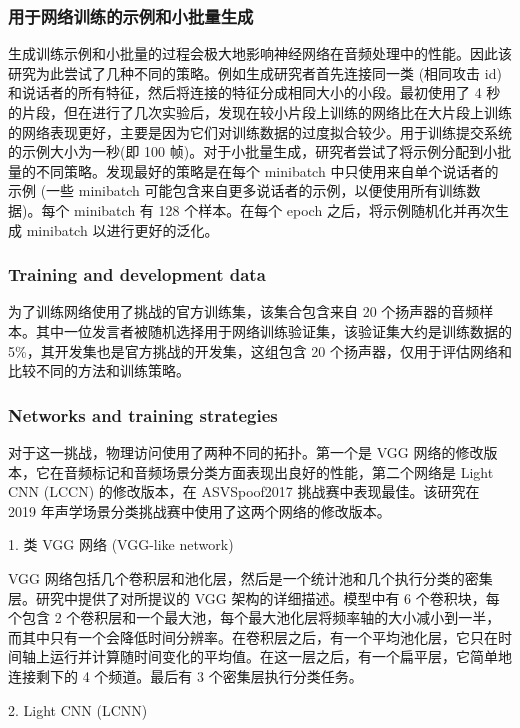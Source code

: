 \subsubsection{用于网络训练的示例和小批量生成}

生成训练示例和小批量的过程会极大地影响神经网络在音频处理中的性能。因此该研究为此尝试了几种不同的策略。例如生成研究者首先连接同一类 (相同攻击 id)和说话者的所有特征，然后将连接的特征分成相同大小的小段。最初使用了 4 秒的片段，但在进行了几次实验后，发现在较小片段上训练的网络比在大片段上训练的网络表现更好，主要是因为它们对训练数据的过度拟合较少。用于训练提交系统的示例大小为一秒(即 100 帧)。对于小批量生成，研究者尝试了将示例分配到小批量的不同策略。发现最好的策略是在每个 minibatch 中只使用来自单个说话者的示例 (一些 minibatch 可能包含来自更多说话者的示例，以便使用所有训练数据)。每个 minibatch 有 128 个样本。在每个 epoch 之后，将示例随机化并再次生成 minibatch 以进行更好的泛化。

\subsubsection{Training and development data}

为了训练网络使用了挑战的官方训练集，该集合包含来自 20 个扬声器的音频样本。其中一位发言者被随机选择用于网络训练验证集，该验证集大约是训练数据的 5\%，其开发集也是官方挑战的开发集，这组包含 20 个扬声器，仅用于评估网络和比较不同的方法和训练策略。

\subsubsection{Networks and training strategies}

对于这一挑战，物理访问使用了两种不同的拓扑。第一个是 VGG 网络的修改版本，它在音频标记和音频场景分类方面表现出良好的性能，第二个网络是 Light CNN (LCCN) 的修改版本，在 ASVSpoof2017 挑战赛中表现最佳。该研究在 2019 年声学场景分类挑战赛中使用了这两个网络的修改版本。

1. 类 VGG 网络 (VGG-like network)

VGG 网络包括几个卷积层和池化层，然后是一个统计池和几个执行分类的密集层。研究中提供了对所提议的 VGG 架构的详细描述。模型中有 6 个卷积块，每个包含 2 个卷积层和一个最大池，每个最大池化层将频率轴的大小减小到一半，而其中只有一个会降低时间分辨率。在卷积层之后，有一个平均池化层，它只在时间轴上运行并计算随时间变化的平均值。在这一层之后，有一个扁平层，它简单地连接剩下的 4 个频道。最后有 3 个密集层执行分类任务。

2. Light CNN (LCNN)

